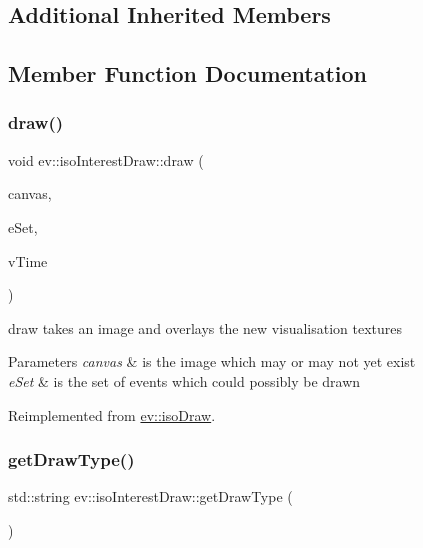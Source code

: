 \subsection*{Additional Inherited Members}


\subsection{Member Function Documentation}
\mbox{\label{classev_1_1isoInterestDraw_a3276f946c09d4cd0009f8379ea24d409}} 
\subsubsection{\texorpdfstring{draw()}{draw()}}
{\footnotesize\ttfamily void ev\+::iso\+Interest\+Draw\+::draw (\begin{DoxyParamCaption}\item[{cv\+::\+Mat \&}]{canvas,  }\item[{const ev\+::v\+Queue \&}]{e\+Set,  }\item[{int}]{v\+Time }\end{DoxyParamCaption})\hspace{0.3cm}{\ttfamily [virtual]}}



draw takes an image and overlays the new visualisation textures 


\begin{DoxyParams}{Parameters}
{\em canvas} & is the image which may or may not yet exist \\
\hline
{\em e\+Set} & is the set of events which could possibly be drawn \\
\hline
\end{DoxyParams}


Reimplemented from \hyperlink{classev_1_1isoDraw_ad481b618ae2d08664481ffc4b3c4dd95}{ev\+::iso\+Draw}.

\mbox{\label{classev_1_1isoInterestDraw_a93b2142d5652f725e21d34fedde103df}} 
\subsubsection{\texorpdfstring{get\+Draw\+Type()}{getDrawType()}}
{\footnotesize\ttfamily std\+::string ev\+::iso\+Interest\+Draw\+::get\+Draw\+Type (\begin{DoxyParamCaption}{ }\end{DoxyParamCaption})\hspace{0.3cm}{\ttfamily [virtual]}}



